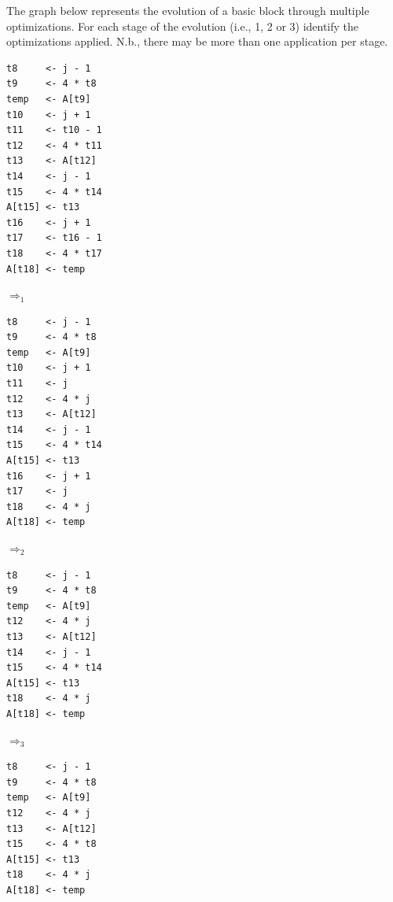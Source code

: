 \documentclass[11pt]{article} %
\begin{document}
\begin{enumerate}
\noindent The graph below represents the evolution of a basic block through multiple optimizations. For each stage of the evolution (i.e., 1, 2 or 3) identify the optimizations applied. N.b.,  there may be more than one application per stage.
\vspace{2ex}

\begin{minipage}{1.6in}
\begin{Verbatim}[frame=single,framesep=2mm]
t8     <- j - 1
t9     <- 4 * t8
temp   <- A[t9]
t10    <- j + 1
t11    <- t10 - 1
t12    <- 4 * t11
t13    <- A[t12]
t14    <- j - 1
t15    <- 4 * t14
A[t15] <- t13
t16    <- j + 1
t17    <- t16 - 1
t18    <- 4 * t17
A[t18] <- temp
\end{Verbatim}
\end{minipage}
%
%
%
\begin{minipage}{0.3in}
{\Large$\Rightarrow_1$}
\end{minipage}
%
%
%
\begin{minipage}{1.6in}
\begin{Verbatim}[frame=single,framesep=2mm]
t8     <- j - 1
t9     <- 4 * t8
temp   <- A[t9]
t10    <- j + 1
t11    <- j
t12    <- 4 * j
t13    <- A[t12]
t14    <- j - 1
t15    <- 4 * t14
A[t15] <- t13
t16    <- j + 1
t17    <- j
t18    <- 4 * j
A[t18] <- temp
\end{Verbatim}
\end{minipage}
%
%
%
\begin{minipage}{0.3in}
{\Large$\Rightarrow_2$}
\end{minipage}
%
%
%
\begin{minipage}{1.6in}
\begin{Verbatim}[frame=single,framesep=2mm]
t8     <- j - 1
t9     <- 4 * t8
temp   <- A[t9]
t12    <- 4 * j
t13    <- A[t12]
t14    <- j - 1
t15    <- 4 * t14
A[t15] <- t13
t18    <- 4 * j
A[t18] <- temp
\end{Verbatim}
\end{minipage}
%
%
%
\begin{minipage}{0.3in}
{\Large$\Rightarrow_3$}
\end{minipage}
%
%
%
\begin{minipage}{1.6in}
\begin{Verbatim}[frame=single,framesep=2mm]
t8     <- j - 1
t9     <- 4 * t8
temp   <- A[t9]
t12    <- 4 * j
t13    <- A[t12]
t15    <- 4 * t8
A[t15] <- t13
t18    <- 4 * j
A[t18] <- temp
\end{Verbatim}
\end{minipage}











\end{enumerate}
\end{document}
